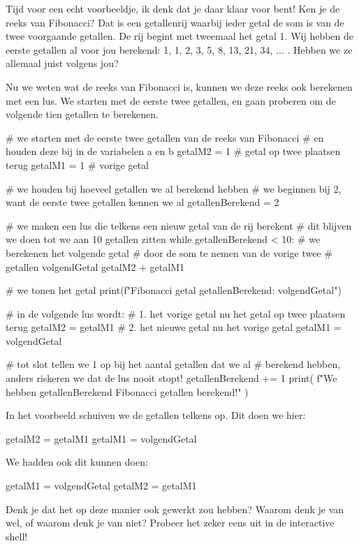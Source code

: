 Tijd voor een echt voorbeeldje,
ik denk dat je daar klaar voor bent!
Ken je de reeks van Fibonacci?
Dat is een getallenrij waarbij ieder getal de som is van de twee voorgaande getallen.
De rij begint met tweemaal het getal 1.
Wij hebben de eerste getallen al voor jou berekend: 1, 1, 2, 3, 5, 8, 13, 21, 34, ... .
Hebben we ze allemaal juist volgens jou?
\par
Nu we weten wat de reeks van Fibonacci is, kunnen we deze reeks ook berekenen met een lus.
We starten met de eerste twee getallen, en gaan proberen om de volgende tien getallen te berekenen.
\begin{pyEnv}
	# we starten met de eerste twee getallen van de reeks van Fibonacci
	# en houden deze bij in de variabelen a en b
	getalM2 = 1             # getal op twee plaatsen terug
	getalM1 = 1             # vorige getal
	
	# we houden bij hoeveel getallen we al berekend hebben
	# we beginnen bij 2, want de eerste twee getallen kennen we al
	getallenBerekend = 2
	
	# we maken een lus die telkens een nieuw getal van de rij berekent
	# dit blijven we doen tot we aan 10 getallen zitten
	while getallenBerekend < 10:
		# we berekenen het volgende getal
		# door de som te nemen van de vorige twee
		# getallen
		volgendGetal getalM2 + getalM1

		# we tonen het getal
		print(f"Fibonacci getal {getallenBerekend}: {volgendGetal}")

		# in de volgende lus wordt:
		# 1. het vorige getal nu het getal op twee plaatsen terug
		getalM2 = getalM1
		# 2. het nieuwe getal nu het vorige getal
		getalM1 = volgendGetal

		# tot slot tellen we 1 op bij het aantal getallen dat we al
		# berekend hebben, anders riskeren we dat de lus nooit stopt!
		getallenBerekend += 1
	print(
		f"We hebben {getallenBerekend} Fibonacci getallen berekend!"
	)
\end{pyEnv}

\begin{letsTryOut}
	In het voorbeeld schuiven we de getallen telkens op.
	Dit doen we hier:
\begin{pyEnv}
getalM2 = getalM1
getalM1 = volgendGetal
\end{pyEnv}
	We hadden ook dit kunnen doen:
\begin{pyEnv}
getalM1 = volgendGetal
getalM2 = getalM1
\end{pyEnv}
	Denk je dat het op deze manier ook gewerkt zou hebben?
	\newline
	Waarom denk je van wel, of waarom denk je van niet?
	\newline
	Probeer het zeker eens uit in de interactive shell!
\end{letsTryOut}

